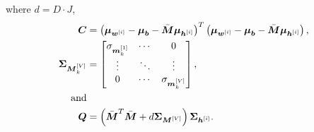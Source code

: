 where $d=D\cdot J$, 
\begin{align*}
\vec C &= \left(\Vwi - \Vwo - \VWV \Vhi\right)^T \left(\Vwi - \Vwo - \VWV \Vhi\right), \\
 \VLVk &= \begin{bmatrix} 
\Vlvkel{1} & \cdots & 0 \\
\vdots & \ddots & \vdots \\ 
0 & \cdots & \Vlvkel{V}\\
\end{bmatrix}, \\
\textrm{and} \\
\vec Q &= \left(\VWV^T \VWV + d \VLV\right)\Vgi.
\end{align*}
 
